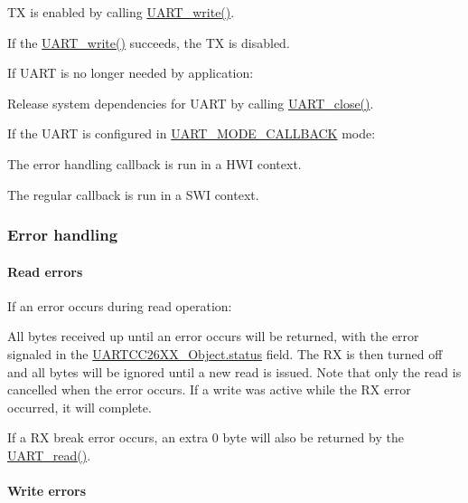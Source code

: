 \begin{DoxyItemize}
\item T\+X is enabled by calling \hyperlink{_u_a_r_t_8h_a6f2a04c09dc17886e69e361cd80aaedc}{U\+A\+R\+T\+\_\+write()}.
\item If the \hyperlink{_u_a_r_t_8h_a6f2a04c09dc17886e69e361cd80aaedc}{U\+A\+R\+T\+\_\+write()} succeeds, the T\+X is disabled.
\end{DoxyItemize}If U\+A\+R\+T is no longer needed by application\+:
\begin{DoxyItemize}
\item Release system dependencies for U\+A\+R\+T by calling \hyperlink{_u_a_r_t_8h_a6b49b65f3db709c408dc4db23a68895d}{U\+A\+R\+T\+\_\+close()}.
\end{DoxyItemize}If the U\+A\+R\+T is configured in \hyperlink{_u_a_r_t_8h_a2507a620dba95cd20885c52494d19e90ae0dbd9b5195e56c3c2aed10163523754}{U\+A\+R\+T\+\_\+\+M\+O\+D\+E\+\_\+\+C\+A\+L\+L\+B\+A\+C\+K} mode\+:
\begin{DoxyItemize}
\item The error handling callback is run in a H\+W\+I context.
\item The regular callback is run in a S\+W\+I context.
\end{DoxyItemize}

\subsubsection*{Error handling}

\paragraph*{Read errors}

If an error occurs during read operation\+:
\begin{DoxyItemize}
\item All bytes received up until an error occurs will be returned, with the error signaled in the \hyperlink{struct_u_a_r_t_c_c26_x_x___object_a10ff4c367c40263e72d3494f78b9ce07}{U\+A\+R\+T\+C\+C26\+X\+X\+\_\+\+Object.\+status} field. The R\+X is then turned off and all bytes will be ignored until a new read is issued. Note that only the read is cancelled when the error occurs. If a write was active while the R\+X error occurred, it will complete.
\item If a R\+X break error occurs, an extra 0 byte will also be returned by the \hyperlink{_u_a_r_t_8h_a023152d57539cad94bdd813956013e73}{U\+A\+R\+T\+\_\+read()}.
\end{DoxyItemize}\paragraph*{Write errors}

